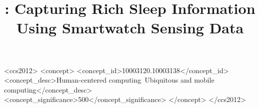 \documentclass[acmlarge]{acmart}
\begin{document}
\title{\systemname: Capturing Rich Sleep Information Using Smartwatch Sensing Data}

%




\begin{CCSXML}
	<ccs2012>
	<concept>
	<concept_id>10003120.10003138</concept_id>
	<concept_desc>Human-centered computing~Ubiquitous and mobile computing</concept_desc>
	<concept_significance>500</concept_significance>
	</concept>
	</ccs2012>
\end{CCSXML}




\maketitle













\end{document}
